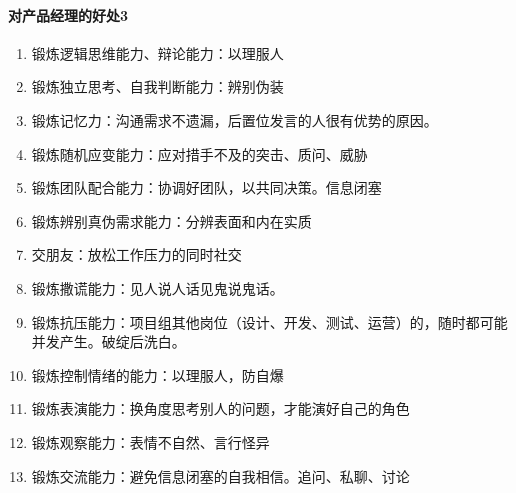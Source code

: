 \documentclass[letterpaper,11pt,english]{sphinxmanual}
\begin{document}
\paragraph{对产品经理的好处3\sphinxfootnotemark[220]}
\label{\detokenize{chapter_experience/jubensha:id7}}%
\begin{footnotetext}[220]\sphinxAtStartFootnote
{}
%
\end{footnotetext}\ignorespaces \begin{enumerate}
%
\item {} 
锻炼逻辑思维能力、辩论能力：以理服人

\item {} 
锻炼独立思考、自我判断能力：辨别伪装

\item {} 
锻炼记忆力：沟通需求不遗漏，后置位发言的人很有优势的原因。

\item {} 
锻炼随机应变能力：应对措手不及的突击、质问、威胁%
\begin{footnote}[221]\sphinxAtStartFootnote
{}
%
\end{footnote}

\item {} 
锻炼团队配合能力：协调好团队，以共同决策。信息闭塞

\item {} 
锻炼辨别真伪需求能力：分辨表面和内在实质

\item {} 
交朋友：放松工作压力的同时社交

\item {} 
锻炼撒谎能力：见人说人话见鬼说鬼话。

\item {} 
锻炼抗压能力：项目组其他岗位（设计、开发、测试、运营）的，随时都可能并发产生。破绽后洗白。

\item {} 
锻炼控制情绪的能力：以理服人，防自爆

\item {} 
锻炼表演能力：换角度思考别人的问题，才能演好自己的角色

\item {} 
锻炼观察能力：表情不自然、言行怪异%
\begin{footnote}[222]\sphinxAtStartFootnote
{}
%
\end{footnote}

\item {} 
锻炼交流能力：避免信息闭塞的自我相信。追问、私聊、讨论

\end{enumerate}
\end{document}
